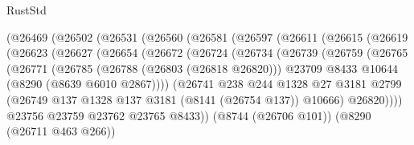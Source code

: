 \begin{lexlean}{RustStd}
\begin{coremodule}
                  (@26469
                    (@26502
                      (@26531
                        (@26560
                          (@26581
                            (@26597
                              (@26611
                                (@26615
                                  (@26619
                                    (@26623
                                      (@26627
                                        (@26654
                                          (@26672
                                            (@26724
                                              (@26734
                                                (@26739
                                                  (@26759
                                                    (@26765
                                                      (@26771
                                                        (@26785
                                                          (@26788 (@26803 (@26818 @26820)))
                                                          @23709
                                                          @8433
                                                          @10644
                                                          (@8290 (@8639 @6010 @2867))))
                                                      (@26741
                                                        @238
                                                        @244
                                                        @1328
                                                        @27
                                                        @3181
                                                        @2799
                                                        (@26749
                                                          @137
                                                          @1328
                                                          @137
                                                          @3181
                                                          (@8141 (@26754 @137))
                                                          @10666)
                                                        @26820))))
                                                @23756
                                                @23759
                                                @23762
                                                @23765
                                                @8433))
                                            (@8744 (@26706 @101))
                                            (@8290 (@26711 @463 @266))

\end{coremodule}
\end{lexlean}
